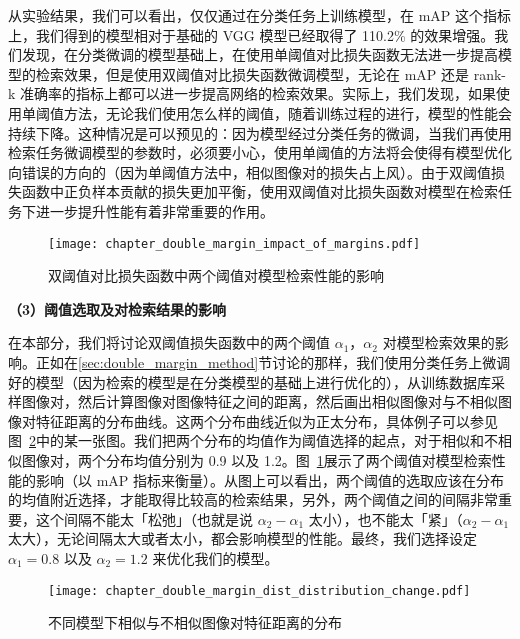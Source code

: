 从实验结果，我们可以看出，仅仅通过在分类任务上训练模型，在 mAP 这个指标上，我们得到的模型相对于基础的 VGG 模型已经取得了 110.2\% 的效果增强。我们发现，在分类微调的模型基础上，在使用单阈值对比损失函数无法进一步提高模型的检索效果，但是使用双阈值对比损失函数微调模型，无论在 mAP 还是 rank-k 准确率的指标上都可以进一步提高网络的检索效果。实际上，我们发现，如果使用单阈值方法，无论我们使用怎么样的阈值，随着训练过程的进行，模型的性能会持续下降。这种情况是可以预见的：因为模型经过分类任务的微调，当我们再使用检索任务微调模型的参数时，必须要小心，使用单阈值的方法将会使得有模型优化向错误的方向的（因为单阈值方法中，相似图像对的损失占上风）。由于双阈值损失函数中正负样本贡献的损失更加平衡，使用双阈值对比损失函数对模型在检索任务下进一步提升性能有着非常重要的作用。

\begin{figure}[t]
	\centering
	\texttt{[image: chapter\_double\_margin\_impact\_of\_margins.pdf]}
	\caption{双阈值对比损失函数中两个阈值对模型检索性能的影响}
	\label{fig:impact_of_margins}
\end{figure}

\textbf{（3）阈值选取及对检索结果的影响}

在本部分，我们将讨论双阈值损失函数中的两个阈值 $\alpha_1$，$\alpha_2$ 对模型检索效果的影响。正如在\ref{sec:double_margin_method}节讨论的那样，我们使用分类任务上微调好的模型（因为检索的模型是在分类模型的基础上进行优化的），从训练数据库采样图像对，然后计算图像对图像特征之间的距离，然后画出相似图像对与不相似图像对特征距离的分布曲线。这两个分布曲线近似为正太分布，具体例子可以参见图~\ref{fig:feat_dist_distribution_change}中的某一张图。我们把两个分布的均值作为阈值选择的起点，对于相似和不相似图像对，两个分布均值分别为 0.9 以及 1.2。图~\ref{fig:impact_of_margins}展示了两个阈值对模型检索性能的影响（以 mAP 指标来衡量）。从图上可以看出，两个阈值的选取应该在分布的均值附近选择，才能取得比较高的检索结果，另外，两个阈值之间的间隔非常重要，这个间隔不能太「松弛」（也就是说 $\alpha_2 - \alpha_1$ 太小），也不能太「紧」（$\alpha_2 - \alpha_1$ 太大），无论间隔太大或者太小，都会影响模型的性能。最终，我们选择设定 $\alpha_1=0.8$ 以及 $\alpha_2=1.2$ 来优化我们的模型。
\begin{figure}[t]
	\centering
	\texttt{[image: chapter\_double\_margin\_dist\_distribution\_change.pdf]}
	\caption{不同模型下相似与不相似图像对特征距离的分布}
	\label{fig:feat_dist_distribution_change}
\end{figure}

